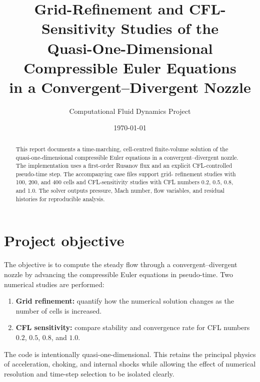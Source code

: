 \documentclass[11pt,a4paper]{article}
\title{Grid-Refinement and CFL-Sensitivity Studies of the\\
Quasi-One-Dimensional Compressible Euler Equations\\
in a Convergent--Divergent Nozzle}
\author{Computational Fluid Dynamics Project}
\date{\today}
\begin{document}
\maketitle

\begin{abstract}
This report documents a time-marching, cell-centred finite-volume solution of
the quasi-one-dimensional compressible Euler equations in a convergent--divergent
nozzle. The implementation uses a first-order Rusanov flux and an explicit
CFL-controlled pseudo-time step. The accompanying case files support grid-
refinement studies with 100, 200, and 400 cells and CFL-sensitivity studies with
CFL numbers 0.2, 0.5, 0.8, and 1.0. The solver outputs pressure, Mach number,
flow variables, and residual histories for reproducible analysis.
\end{abstract}

\tableofcontents

\section{Project objective}
The objective is to compute the steady flow through a convergent--divergent
nozzle by advancing the compressible Euler equations in pseudo-time. Two
numerical studies are performed:
\begin{enumerate}
  \item \textbf{Grid refinement:} quantify how the numerical solution changes
        as the number of cells is increased.
  \item \textbf{CFL sensitivity:} compare stability and convergence rate for
        CFL numbers $0.2$, $0.5$, $0.8$, and $1.0$.
\end{enumerate}

The code is intentionally quasi-one-dimensional. This retains the principal
physics of acceleration, choking, and internal shocks while allowing the effect
of numerical resolution and time-step selection to be isolated clearly.
\end{document}
